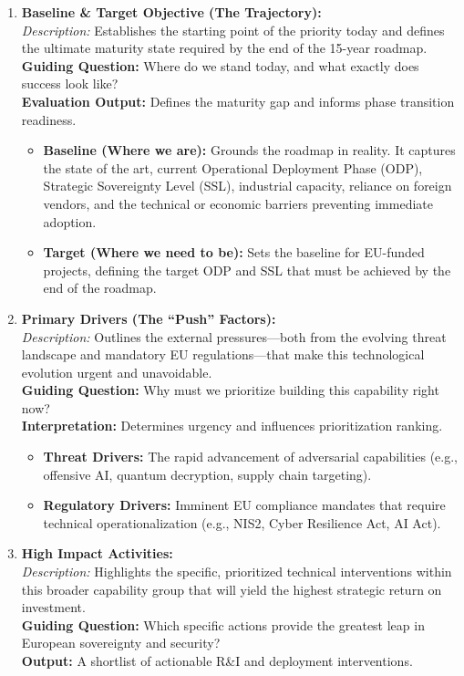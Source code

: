\documentclass{ieeeaccess}
\begin{document}
\begin{enumerate}
    \item \textbf{Baseline \& Target Objective (The Trajectory):}\\
    \textit{Description:} Establishes the starting point of the priority today and defines the ultimate maturity state required by the end of the 15-year roadmap.\\
    \textbf{Guiding Question:} Where do we stand today, and what exactly does success look like?\\
    \textbf{Evaluation Output:} Defines the maturity gap and informs phase transition readiness.
    \begin{itemize}
    \item \textbf{Baseline (Where we are):} Grounds the roadmap in reality. It captures the state of the art, current Operational Deployment Phase (ODP), Strategic Sovereignty Level (SSL), industrial capacity, reliance on foreign vendors, and the technical or economic barriers preventing immediate adoption.
    \item \textbf{Target (Where we need to be):} Sets the baseline for EU-funded projects, defining the target ODP and SSL that must be achieved by the end of the roadmap.
\end{itemize}
    
    \item \textbf{Primary Drivers (The ``Push'' Factors):}\\
    \textit{Description:} Outlines the external pressures---both from the evolving threat landscape and mandatory EU regulations---that make this technological evolution urgent and unavoidable.\\
    \textbf{Guiding Question:} Why must we prioritize building this capability right now?\\
    \textbf{Interpretation:} Determines urgency and influences prioritization ranking.
    \begin{itemize}
        \item \textbf{Threat Drivers:} The rapid advancement of adversarial capabilities (e.g., offensive AI, quantum decryption, supply chain targeting).
        \item \textbf{Regulatory Drivers:} Imminent EU compliance mandates that require technical operationalization (e.g., NIS2, Cyber Resilience Act, AI Act).
    \end{itemize}

    \item \textbf{High Impact Activities:}\\
    \textit{Description:} Highlights the specific, prioritized technical interventions within this broader capability group that will yield the highest strategic return on investment.\\
    \textbf{Guiding Question:} Which specific actions provide the greatest leap in European sovereignty and security?\\
    \textbf{Output:} A shortlist of actionable R\&I and deployment interventions.


\end{enumerate}
\end{document}
